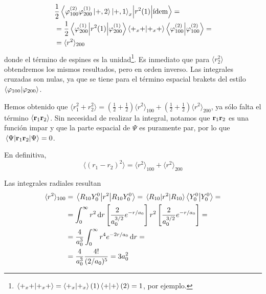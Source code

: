 \begin{equation}
  \begin{split}
    &\frac{1}{2}\mel{
      \varphi_{100}^{(2)}\varphi_{200}^{(1)}\ket{+,2}\ket{+,1}_x}{r^2(1)}{\text{ídem}}
    = \\
    &= \frac{1}{2}
    \mel{\varphi_{200}^{(1)}}{r^2(1)}{\varphi_{200}^{(1)}}\braket{+_x+}{+_x+}\braket{\varphi_{100}^{(2)}}{\varphi_{100}^{(2)}}
    = \\
    &= \langle r^2\rangle_{200}
  \end{split}
\end{equation}
donde el término de espines es la
unidad\footnote{$\braket{+_x+}{+_x+}=\braket{+_x}{+_x}(1)\braket{+}{+}(2)
  = 1$, por ejemplo.}. Es inmediato que para $\langle r_2^2\rangle$ obtendremos los mismos
resultados, pero en orden inverso. Las integrales cruzadas son nulas,
ya que se tiene para el término espacial brakets del estilo $\braket{\varphi_{100}}{\varphi_{200}}$.

Hemos obtenido que $\langle r_1^2 + r_2^2\rangle = \left( \frac{1}{2}+\frac{1}{2} \right)\langle
r^2\rangle_{100}+ \left( \frac{1}{2}+\frac{1}{2} \right)\langle r^2\rangle_{200}$, ya sólo falta el término
$\langle \bm{\mathrm{r}}_1 \bm{\mathrm{r}}_2\rangle$. Sin necesidad de realizar
la integral, notamos que $ \bm{\mathrm{r}}_1 \bm{\mathrm{r}}_2$ es
una función impar y que la parte espacial de $\Psi$ es puramente par,
por lo que $\ev{\boldrm{r}_1 \boldrm{r}_2}{\Psi} =0$.

En definitiva,
\begin{equation}
  \boxed{
\langle (r_1 - r_2)^2 \rangle = \langle
r^2\rangle_{100}+ \langle r^2\rangle_{200}
  }
\end{equation}

Las integrales radiales resultan
\begin{equation}
  \begin{split}
    \langle r^2\rangle_{100} &= \mel{R_{10}Y_0^0}{r^2}{R_{10}Y_0^0}
    = \mel{R_{10}}{r^2}{R_{10}}\braket{Y_0^0}{Y_0^0} = \\
    &= \int_0^\infty r^2 \dd{r} \left[ \frac{2}{a_0^{3/2}}
      e^{-r/a_0} \right] r^2 \left[ \frac{2}{a_0^{3/2}}
      e^{-r/a_0} \right] = \\
    &= \frac{4}{a_0^3} \int_0^\infty r^4 e^{-2r/a_0} \dd{r} = \\
    &= \frac{4}{a_0^3}  \frac{4!}{(2/a_0)^5} = 3a_0^2
  \end{split}
  \label{eq:radial}
\end{equation}

